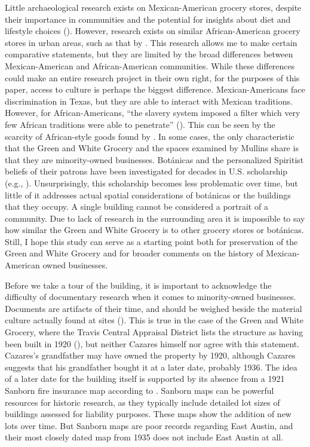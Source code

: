 Little archaeological research exists on Mexican-American grocery stores, despite their importance in communities and the potential for insights about diet and lifestyle choices (\cite[279]{kreneck}). However, research exists on similar African-American grocery stores in urban areas, such as that by \textcite{mullins}. This research allows me to make certain comparative statements, but they are limited by the broad differences between Mexican-American and African-American communities. While these differences could make an entire research project in their own right, for the purposes of this paper, access to culture is perhaps the biggest difference. Mexican-Americans face discrimination in Texas, but they are able to interact with Mexican traditions. However, for African-Americans, “the slavery system imposed a filter which very few African traditions were able to penetrate” (\cite[122]{morner}). This can be seen by the scarcity of African-style goods found by \textcite{mullins}. In some cases, the only characteristic that the Green and White Grocery and the spaces examined by Mullins share is that they are minority-owned businesses.
Botánicas and the personalized Spiritist beliefs of their patrons have been investigated for decades in U.S. scholarship (e.g., \cites{delgado}{fisch}{romberg2005}). Unsurprisingly, this scholarship becomes less problematic over time, but little of it addresses actual spatial considerations of botánicas or the buildings that they occupy. A single building cannot be considered a portrait of a community. Due to lack of research in the surrounding area it is impossible to say how similar the Green and White Grocery is to other grocery stores or botánicas. Still, I hope this study can serve as a starting point both for preservation of the Green and White Grocery and for broader comments on the history of Mexican-American owned businesses.


Before we take a tour of the building, it is important to acknowledge the difficulty of documentary research when it comes to minority-owned businesses. Documents are artifacts of their time, and should be weighed beside the material culture actually found at sites (\cite{moreland}). This is true in the case of the Green and White Grocery, where the Travis Central Appraisal District lists the structure as having been built in 1920 (\cite{tcad}), but neither Cazares himself nor \textcite[75-76]{hardy} agree with this statement. Cazares's grandfather may have owned the property by 1920, although Cazares suggests that his grandfather bought it at a later date, probably 1936. The idea of a later date for the building itself is supported by its absence from a 1921 Sanborn fire insurance map according to \textcite[75-76]{hardy}. Sanborn maps can be powerful resources for historic research, as they typically include detailed lot sizes of buildings assessed for liability purposes. These maps show the addition of new lots over time. But Sanborn maps are poor records regarding East Austin, and their most closely dated map from 1935 \parencite{sanborn} does not include East Austin at all.


